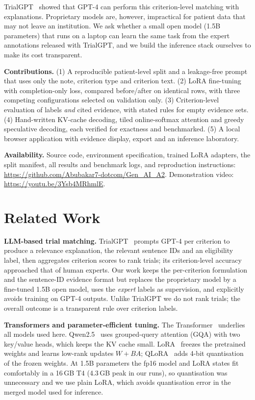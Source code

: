 \documentclass[conference]{IEEEtran}
\begin{document}
TrialGPT~\cite{jin2024trialgpt} showed that GPT-4 can perform this criterion-level matching with explanations. Proprietary models are, however, impractical for patient data that may not leave an institution. We ask whether a small open model (1.5B parameters) that runs on a laptop can learn the same task from the expert annotations released with TrialGPT, and we build the inference stack ourselves to make its cost transparent.

\textbf{Contributions.} (1) A reproducible patient-level split and a leakage-free prompt that uses only the note, criterion type and criterion text. (2) LoRA fine-tuning with completion-only loss, compared before/after on identical rows, with three competing configurations selected on validation only. (3) Criterion-level evaluation of labels \emph{and} cited evidence, with stated rules for empty evidence sets. (4) Hand-written KV-cache decoding, tiled online-softmax attention and greedy speculative decoding, each verified for exactness and benchmarked. (5) A local browser application with evidence display, export and an inference laboratory.

\textbf{Availability.} Source code, environment specification, trained LoRA adapters, the split manifest, all results and benchmark logs, and reproduction instructions: \url{https://github.com/Abubakar7-dotcom/Gen_AI_A2}. Demonstration video: \url{https://youtu.be/3Ysb4MRhmlE}.

\section{Related Work}
\textbf{LLM-based trial matching.} TrialGPT~\cite{jin2024trialgpt} prompts GPT-4 per criterion to produce a relevance explanation, the relevant sentence IDs and an eligibility label, then aggregates criterion scores to rank trials; its criterion-level accuracy approached that of human experts. Our work keeps the per-criterion formulation and the sentence-ID evidence format but replaces the proprietary model by a fine-tuned 1.5B open model, uses the \emph{expert} labels as supervision, and explicitly avoids training on GPT-4 outputs. Unlike TrialGPT we do not rank trials; the overall outcome is a transparent rule over criterion labels.

\textbf{Transformers and parameter-efficient tuning.} The Transformer~\cite{vaswani2017attention} underlies all models used here. Qwen2.5~\cite{qwen2025} uses grouped-query attention (GQA) with two key/value heads, which keeps the KV cache small. LoRA~\cite{hu2022lora} freezes the pretrained weights and learns low-rank updates $W + BA$; QLoRA~\cite{dettmers2023qlora} adds 4-bit quantisation of the frozen weights. At 1.5B parameters the fp16 model and LoRA states fit comfortably in a 16\,GB T4 (4.3\,GB peak in our runs), so quantisation was unnecessary and we use plain LoRA, which avoids quantisation error in the merged model used for inference.
\end{document}
